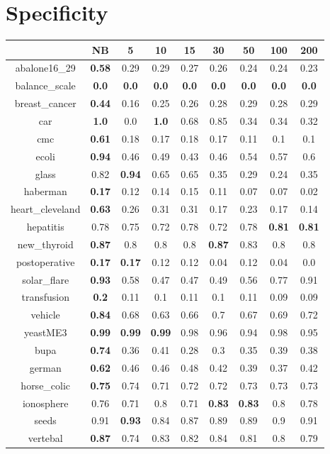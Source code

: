 \documentclass{article}%
\begin{document}
%
\section*{Specificity}%
\begin{tabular}{c|cccccccc}%
\hline%
&NB&5&10&15&30&50&100&200\\%
\hline%
abalone16\_29&\textbf{0.58}&0.29&0.29&0.27&0.26&0.24&0.24&0.23\\%
\hline%
balance\_scale&\textbf{0.0}&\textbf{0.0}&\textbf{0.0}&\textbf{0.0}&\textbf{0.0}&\textbf{0.0}&\textbf{0.0}&\textbf{0.0}\\%
\hline%
breast\_cancer&\textbf{0.44}&0.16&0.25&0.26&0.28&0.29&0.28&0.29\\%
\hline%
car&\textbf{1.0}&0.0&\textbf{1.0}&0.68&0.85&0.34&0.34&0.32\\%
\hline%
cmc&\textbf{0.61}&0.18&0.17&0.18&0.17&0.11&0.1&0.1\\%
\hline%
ecoli&\textbf{0.94}&0.46&0.49&0.43&0.46&0.54&0.57&0.6\\%
\hline%
glass&0.82&\textbf{0.94}&0.65&0.65&0.35&0.29&0.24&0.35\\%
\hline%
haberman&\textbf{0.17}&0.12&0.14&0.15&0.11&0.07&0.07&0.02\\%
\hline%
heart\_cleveland&\textbf{0.63}&0.26&0.31&0.31&0.17&0.23&0.17&0.14\\%
\hline%
hepatitis&0.78&0.75&0.72&0.78&0.72&0.78&\textbf{0.81}&\textbf{0.81}\\%
\hline%
new\_thyroid&\textbf{0.87}&0.8&0.8&0.8&\textbf{0.87}&0.83&0.8&0.8\\%
\hline%
postoperative&\textbf{0.17}&\textbf{0.17}&0.12&0.12&0.04&0.12&0.04&0.0\\%
\hline%
solar\_flare&\textbf{0.93}&0.58&0.47&0.47&0.49&0.56&0.77&0.91\\%
\hline%
transfusion&\textbf{0.2}&0.11&0.1&0.11&0.1&0.11&0.09&0.09\\%
\hline%
vehicle&\textbf{0.84}&0.68&0.63&0.66&0.7&0.67&0.69&0.72\\%
\hline%
yeastME3&\textbf{0.99}&\textbf{0.99}&\textbf{0.99}&0.98&0.96&0.94&0.98&0.95\\%
\hline%
bupa&\textbf{0.74}&0.36&0.41&0.28&0.3&0.35&0.39&0.38\\%
\hline%
german&\textbf{0.62}&0.46&0.46&0.48&0.42&0.39&0.37&0.42\\%
\hline%
horse\_colic&\textbf{0.75}&0.74&0.71&0.72&0.72&0.73&0.73&0.73\\%
\hline%
ionosphere&0.76&0.71&0.8&0.71&\textbf{0.83}&\textbf{0.83}&0.8&0.78\\%
\hline%
seeds&0.91&\textbf{0.93}&0.84&0.87&0.89&0.89&0.9&0.91\\%
\hline%
vertebal&\textbf{0.87}&0.74&0.83&0.82&0.84&0.81&0.8&0.79\\%
\hline%
\end{tabular}
\end{document}
